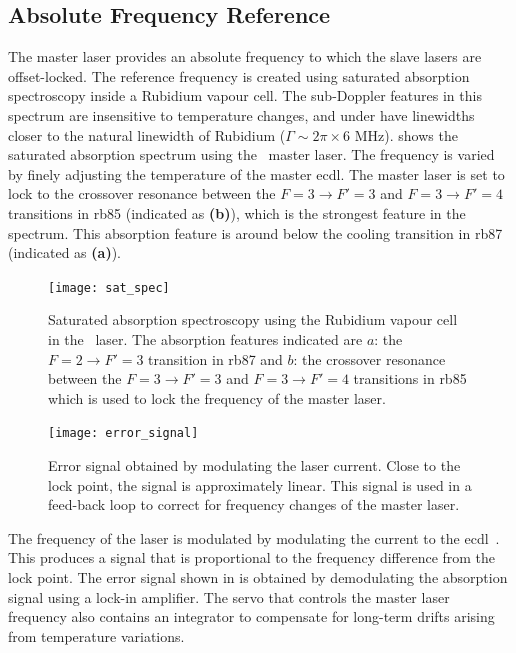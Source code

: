 \subsection{Absolute Frequency Reference}\label{subsec:muquans_master}
The master laser provides an absolute frequency to which the slave
lasers are offset-locked. The reference frequency is created using 
saturated absorption spectroscopy inside a Rubidium vapour cell. The sub-Doppler
features in this spectrum are insensitive to temperature changes, and under
have linewidths closer to the natural linewidth of
Rubidium (\(\Gamma \sim 2\pi \times 6\) MHz). 
shows the saturated absorption spectrum using the \Muquans\ master laser. The frequency is varied
by finely adjusting the temperature of the master \ac{ecdl}. The
master laser is set to lock to the crossover resonance between the \(F = 3
\rightarrow F' = 3\) and \(F = 3 \rightarrow F' = 4 \) transitions in \ac{rb85}
(indicated as \textbf{(b)}), which is the strongest feature in the spectrum. This
absorption feature is around  below the cooling
transition in \ac{rb87} (indicated as \textbf{(a)}).
\begin{figure}[!htbp]
	\texttt{[image: sat\_spec]}
	\caption[Saturated absorption spectroscopy of the \\Muquans\ master laser.]{Saturated absorption spectroscopy using the Rubidium vapour cell in the \Muquans\ laser. The absorption features indicated are \(a\): the \(F = 2 \rightarrow F' = 3\) transition in \ac{rb87} and \(b\): the crossover resonance between the \(F = 3 \rightarrow F' = 3\) and \(F = 3 \rightarrow F' = 4 \) transitions in \ac{rb85} which is used to lock the frequency of the master laser.}\label{fig:muquans_satspec}
\end{figure}
\begin{figure}[!htbp]
	\texttt{[image: error\_signal]}
	\caption[Error Signal for the \Muquans\ master servo.]{Error signal obtained by modulating the laser current. Close to the lock point, the signal is approximately linear. This signal is used in a feed-back loop to correct for frequency changes of the master laser.}\label{fig:muquans_error_signal}
\end{figure}
The frequency of the laser is modulated by modulating the current to
the \ac{ecdl}~\cite{Supplee1994}. This produces a signal that is
proportional to the frequency difference from the lock point. The error signal shown in
 is obtained by demodulating the absorption
signal using a lock-in amplifier. The servo that controls the master laser frequency also contains
an integrator to compensate for long-term drifts arising from temperature
variations.
